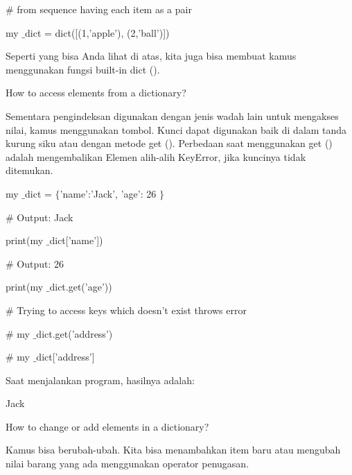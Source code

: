 \vspace{12pt}
\noindent 
 \hspace*{0.5in}  $  \#  $ from sequence having each item as a pair \par
\noindent 
 \hspace*{0.5in} my $  \_  $dict = dict([(1,'apple'), (2,'ball')]) \par
\noindent 
Seperti yang bisa Anda lihat di atas, kita juga bisa membuat kamus menggunakan fungsi built-in dict (). \par
\noindent 
How to access elements from a dictionary? \par
\noindent 
Sementara pengindeksan digunakan dengan jenis wadah lain untuk mengakses nilai, kamus menggunakan tombol. Kunci dapat digunakan baik di dalam tanda kurung siku atau dengan metode get (). Perbedaan saat menggunakan get () adalah mengembalikan Elemen alih-alih KeyError, jika kuncinya tidak ditemukan. \par
\noindent 
 \hspace*{0.5in} my $  \_  $dict =  $  \{  $'name':'Jack', 'age': 26 $  \}  $ \par
\noindent 
 \hspace*{0.5in}  $  \#  $ Output: Jack \par
\noindent 
 \hspace*{0.5in} print(my $  \_  $dict['name']) \par
\noindent 
 \hspace*{0.5in}  $  \#  $ Output: 26 \par
\noindent 
 \hspace*{0.5in} print(my $  \_  $dict.get('age')) \par
\noindent 
 \hspace*{0.5in}  $  \#  $ Trying to access keys which doesn't exist throws error \par
\noindent 
 \hspace*{0.5in}  $  \#  $ my $  \_  $dict.get('address') \par
\noindent 
 \hspace*{0.5in}  $  \#  $ my $  \_  $dict['address'] \par
\noindent 
Saat menjalankan program, hasilnya adalah: \par
\noindent 
Jack \par
{} \par
\vspace{12pt}
\noindent 
How to change or add elements in a dictionary? \par
\noindent 
Kamus bisa berubah-ubah. Kita bisa menambahkan item baru atau mengubah nilai barang yang ada menggunakan operator penugasan. \par
